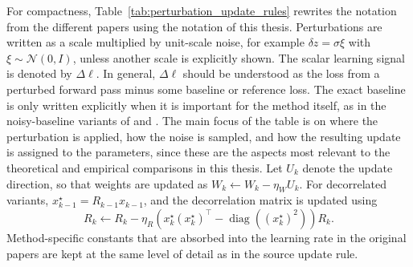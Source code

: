 For compactness, Table~\ref{tab:perturbation_update_rules} rewrites the notation from the different papers using the notation of this thesis. Perturbations are written as a scale multiplied by unit-scale noise, for example \(\delta z=\sigma\xi\) with \(\xi\sim\mathcal{N}(0,I)\), unless another scale is explicitly shown. The scalar learning signal is denoted by \(\Delta \ell\). In general, \(\Delta \ell\) should be understood as the loss from a perturbed forward pass minus some baseline or reference loss. The exact baseline is only written explicitly when it is important for the method itself, as in the noisy-baseline variants of \textcite{cho_node_2011} and \textcite{hara_statistical_2017}. The main focus of the table is on where the perturbation is applied, how the noise is sampled, and how the resulting update is assigned to the parameters, since these are the aspects most relevant to the theoretical and empirical comparisons in this thesis. Let \(U_k\) denote the update direction, so that weights are updated as \(W_k \leftarrow W_k - \eta_W U_k\). For decorrelated variants, \(x_{k-1}^{\star}=R_{k-1}x_{k-1}\), and the decorrelation matrix is updated using
\[
R_k \leftarrow R_k-\eta_R\left(x_k^\star (x_k^\star)^\top-\operatorname{diag}((x_k^\star)^2)\right)R_k .
\]
Method-specific constants that are absorbed into the learning rate in the original papers are kept at the same level of detail as in the source update rule.

